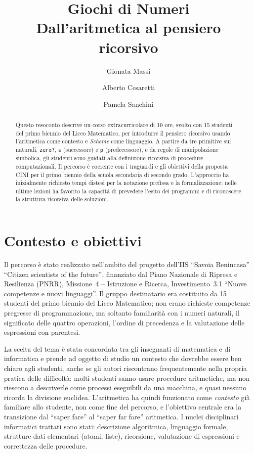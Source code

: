\documentclass[withtimes]{easychair}
\title{Giochi di Numeri\\Dall'aritmetica al pensiero ricorsivo}
\author{
Gionata Massi\inst{1} \and
Alberto Cesaretti\inst{2} \and
Pamela Sanchini\inst{2}
}
\institute{
   Istituto di Istruzione Superiore ``Savoia Benincasa'' di Ancona\\
   \email{gionata.massi@savoiabenincasa.it} \and
   Liceo Scientifico e Musicale ``Einstein'' di Rimini\\
  \email{\{alberto.cesaretti,pamela.sanchini\}@liceoeinstein.it}
''}
\begin{document}
\maketitle


\begin{abstract}
Questo resoconto descrive un corso extracurricolare di 10 ore, svolto con 15 studenti del primo biennio del Liceo Matematico, per introdurre il pensiero ricorsivo usando l'aritmetica come contesto e \emph{Scheme} come linguaggio. A partire da tre primitive sui naturali, \texttt{zero?}, \texttt{s} (successore) e \texttt{p} (predecessore), e da regole di manipolazione simbolica, gli studenti sono guidati alla definizione ricorsiva di procedure computazionali.
Il percorso è coerente con i traguardi e gli obiettivi della proposta CINI per il primo biennio della scuola secondaria di secondo grado.
L'approccio ha inizialmente richiesto tempi distesi per la notazione prefissa e la formalizzazione; nelle ultime lezioni ha favorito la capacità di prevedere l'esito dei programmi e di riconoscere la struttura ricorsiva delle soluzioni.
\end{abstract}

\section{Contesto e obiettivi}\label{introduzione}

Il percorso è stato realizzato nell'ambito del progetto dell'IIS ``Savoia Benincasa'' ``Citizen scientists of the future'', finanziato dal Piano Nazionale di Ripresa e Resilienza (PNRR), Missione~4 -- Istruzione e Ricerca, Investimento~3.1 ``Nuove competenze e nuovi linguaggi''. Il gruppo destinatario era costituito da 15 studenti del primo biennio del Liceo Matematico; non erano richieste competenze pregresse di programmazione, ma soltanto familiarità con i numeri naturali, il significato delle quattro operazioni, l'ordine di precedenza e la valutazione delle espressioni con parentesi.

La scelta del tema è stata concordata tra gli insegnanti di matematica e di informatica e prende ad oggetto di studio un contesto che dovrebbe essere ben chiaro agli studenti, anche se gli autori riscontrano frequentemente nella propria pratica delle difficoltà: molti studenti sanno usare procedure aritmetiche, ma non riescono a descriverle come processi eseguibili da una macchina, e quasi nessuno ricorda la divisione euclidea. L'aritmetica ha quindi funzionato come \emph{contesto} già familiare allo studente, non come fine del percorso, e l'obiettivo centrale era la transizione dal ``saper fare'' al ``saper far fare'' aritmetica. I nuclei disciplinari informatici trattati sono stati: descrizione algoritmica, linguaggio formale, strutture dati elementari (atomi, liste), ricorsione, valutazione di espressioni e correttezza delle procedure.
\end{document}
